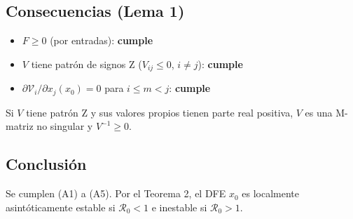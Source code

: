 \documentclass{article}
\begin{document}
\subsection*{Consecuencias (Lema 1)}

\begin{itemize}
  \item $F \ge 0$ (por entradas): \textbf{cumple}
  \item $V$ tiene patrón de signos Z ($V_{ij} \le 0$, $i \ne j$): \textbf{cumple}
  \item $\partial \mathcal{V}_i / \partial x_j (x_0) = 0$ para $i \le m < j$: \textbf{cumple}
\end{itemize}

Si $V$ tiene patrón Z y sus valores propios tienen parte real positiva, $V$ es una M-matriz no singular y $V^{-1} \ge 0$.

\subsection*{Conclusión}

Se cumplen (A1) a (A5). Por el Teorema 2, el DFE $x_0$ es localmente asintóticamente estable si $\mathcal{R}_0 < 1$ e inestable si $\mathcal{R}_0 > 1$.
\end{document}
